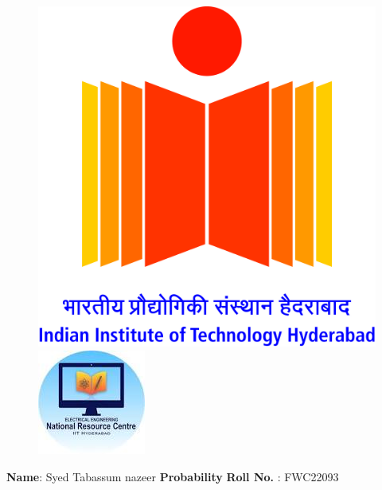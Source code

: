 \documentclass[10pt,a4paper]{report}
\begin{document}
\begin{figure}[!tbp]
  \centering
  \begin{minipage}[b]{0.4\textwidth}
   \includegraphics[scale=0.05]{IITH-logo.jpg} 
  \end{minipage}
  \hfill
  \vspace{5mm}\begin{minipage}[b]{0.4\textwidth}
\raggedleft \includegraphics[scale=0.6]{nrc.jpeg} 
  \end{minipage}\vspace{0.2cm}
\end{figure}
\raggedright \textbf{Name}:\hspace{1mm} Syed Tabassum nazeer\hspace{3cm} \Large \textbf{Probability}\hspace{2.5cm} %
\normalsize \textbf{Roll No.} :\hspace{1mm} FWC22093\vspace{1cm}
\end{document}
